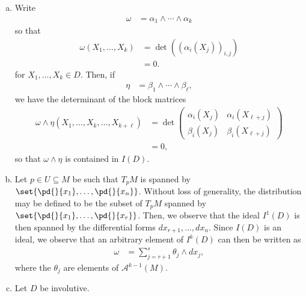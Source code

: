 \documentclass[10pt]{mypackage}
\begin{document}
\begin{solution}\hfill
  \begin{enumerate}[(a)]
    \item Write
      \begin{align*}
        \omega &= \alpha_1\wedge\cdots\wedge \alpha_k
      \end{align*}
      so that
      \begin{align*}
        \omega\left( X_1,\dots,X_k \right) &= \det\left( \left( \alpha_{i}\left( X_j \right) \right)_{i,j} \right)\\
                                           &= 0.
      \end{align*}
      for $X_1,\dots,X_k\in D$. Then, if
      \begin{align*}
        \eta &= \beta_1\wedge\cdots\wedge \beta_{\ell},
      \end{align*}
      we have the determinant of the block matrices
      \begin{align*}
        \omega\wedge\eta \left( X_1,\dots,X_{k},\dots,X_{k + \ell} \right) &= \det \begin{pmatrix}\alpha_{i}\left( X_j \right) & \alpha_{i}\left( X_{\ell + j} \right) \\ \beta_{i}\left( X_j \right) & \beta_i \left( X_{\ell + j} \right)\end{pmatrix}\\
                                                                           &= 0,
      \end{align*}
      so that $\omega\wedge\eta$ is contained in $I(D)$.
    \item Let $p\in U\subseteq M$ be such that $T_pM$ is spanned by $ \set{ \pd{}{x_1},\dots, \pd{}{x_n} } $. Without loss of generality, the distribution may be defined to be the subset of $T_pM$ spanned by $ \set{ \pd{}{x_1},\dots, \pd{}{x_r} } $. Then, we observe that the ideal $I^{1}(D)$ is then spanned by the differential forms $dx_{r+1},\dots,dx_{n}$. Since $I(D)$ is an ideal, we observe that an arbitrary element of $I^{k}\left( D \right)$ can then be written as
      \begin{align*}
        \omega &= \sum_{j=r+1}^{s} \theta_{j} \wedge dx_j,
      \end{align*}
      where the $\theta_{j}$ are elements of $ \mathcal{A}^{k-1}\left( M \right) $.
    \item Let $D$ be involutive.\newline 


\end{enumerate}
\end{solution}
\end{document}
